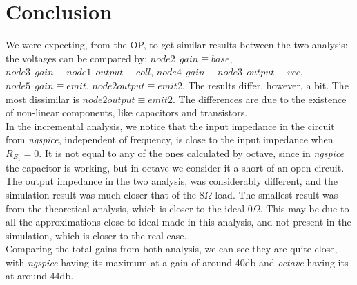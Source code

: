 \section{Conclusion}
We were expecting, from the OP, to get similar results between the two analysis: the voltages can be compared by: $node 2\ \ gain\equiv base$, $node 3\ \ gain\equiv node 1 \ \ output\equiv coll$, $node 4\ \ gain\equiv node3\ \ output \equiv vcc$,$node5 \ \ gain\equiv emit$, $node 2 output\equiv emit2$. The results differ, however, a bit. The most dissimilar is $node 2 output\equiv emit2$. The differences are due to the existence of non-linear components, like capacitors and transistors. \\
In the incremental analysis, we notice that the input impedance in the circuit from \textit{ngspice}, independent of frequency, is close to the input impedance when $R_{E_1}=0$. It is not equal to any of the ones calculated by octave, since in \textit{ngspice} the capacitor is working, but in octave we consider it a short of an open circuit.\\
The output impedance in the two analysis, was considerably different, and the simulation result was much closer that of the $8 \Omega$ load. The smallest result was from the theoretical analysis, which is closer to the ideal $0 \Omega$. This may be due to all the approximations close to ideal made in this analysis, and not present in the simulation, which is closer to the real case.\\
Comparing the total gains from both analysis, we can see they are quite close, with \textit{ngspice} having its maximum at a gain of around 40db and \textit{octave} having its at around 44db. 

